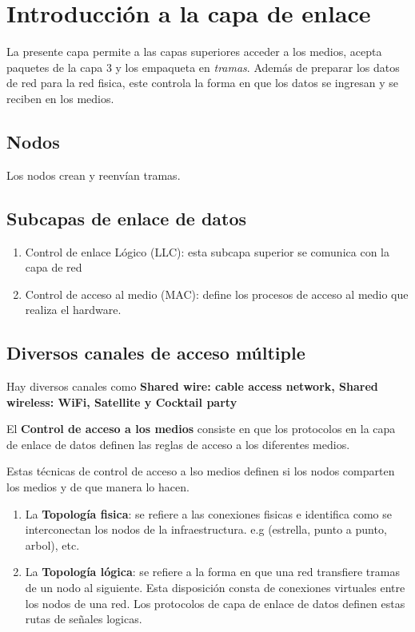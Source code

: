 
\section{Introducción a la capa de enlace}

La presente capa permite a las capas superiores acceder a los medios, acepta paquetes de la capa 3 y los empaqueta en \textit{tramas}. Además de preparar los datos de red para la red fisica, este controla la forma en que los datos se ingresan y se reciben en los medios.

\subsection{Nodos}
Los nodos crean y reenvían tramas.
\subsection{Subcapas de enlace de datos}
\begin{enumerate}
\item Control de enlace Lógico (LLC): esta subcapa superior se comunica con la capa de red
\item Control de acceso al medio (MAC): define los procesos de acceso al medio que realiza el hardware.
\end{enumerate}

\subsection{Diversos canales de acceso múltiple}
Hay diversos canales como \textbf{Shared wire: cable access network, Shared wireless: WiFi, Satellite y Cocktail party}

El \textbf{Control de acceso a los medios} consiste en que los protocolos en la capa de enlace de datos definen las reglas de acceso a los diferentes medios.

Estas técnicas de control de acceso a lso medios definen si los nodos comparten los medios y de que manera lo hacen.

\begin{enumerate}

\item La \textbf{Topología fisica}: se refiere a las conexiones fisicas e identifica como se interconectan los nodos de la infraestructura. e.g (estrella, punto a punto, arbol), etc.
\item La \textbf{Topología lógica}: se refiere a la forma en que una red transfiere tramas de un nodo al siguiente. Esta disposición consta de conexiones virtuales entre los nodos de una red. Los protocolos de capa de enlace de datos definen estas rutas de señales logicas.

\end{enumerate}

